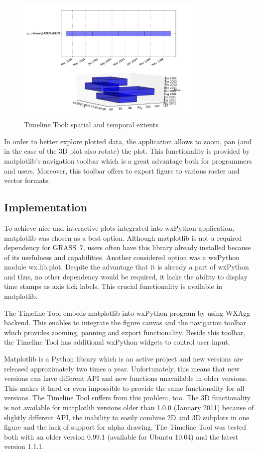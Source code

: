 \documentclass[a4paper,12pt]{book}
\begin{document}
\begin{figure}[ht!]
  \centering
  \includegraphics[width=0.8\textwidth]{./images/timeline2.pdf}
  \caption{Timeline Tool: spatial and temporal extents}
  \label{fig:timeline2}
\end{figure}

In order to better explore plotted data, the application allows to zoom,
pan (and in the case of the 3D plot also rotate) the plot.
This functionality is provided by matplotlib's navigation toolbar which is a great advantage both for programmers and users.
Moreover, this toolbar offers to export figure to various raster and vector formats.

\subsection{Implementation}
To achieve nice and interactive plots integrated into wxPython application, matplotlib was chosen as a best option.
Although matplotlib is not a required dependency for GRASS~7,
users often have this library already installed because of its usefulness and capabilities.
Another considered option was a wxPython module wx.lib.plot.
Despite the advantage that it is already a part of wxPython and thus, no other dependency would be required,
it lacks the ability to display time stamps as axis tick labels. This crucial functionality is available in matplotlib.

The Timeline Tool embeds matplotlib into wxPython program by using WXAgg backend.
This enables to integrate the figure canvas and the navigation toolbar
which provides zooming, panning and export functionality.
Beside this toolbar, the Timeline Tool has additional wxPython widgets to control user input.

Matplotlib is a Python library which is an active project and new versions are released approximately two times a year.
Unfortunately, this means that new versions can have different API and new functions unavailable in older versions.
This makes it hard or even impossible to provide the same functionality for all versions.
The Timeline Tool suffers from this problem, too.
The 3D functionality is not available for matplotlib versions older than 1.0.0 (January 2011)
because of slightly different API, the inability to easily combine 2D and 3D subplots in one figure
and the lack of support for alpha drawing.
The Timeline Tool was tested both with an older version 0.99.1 (available for Ubuntu 10.04) and the latest version 1.1.1.
\end{document}
